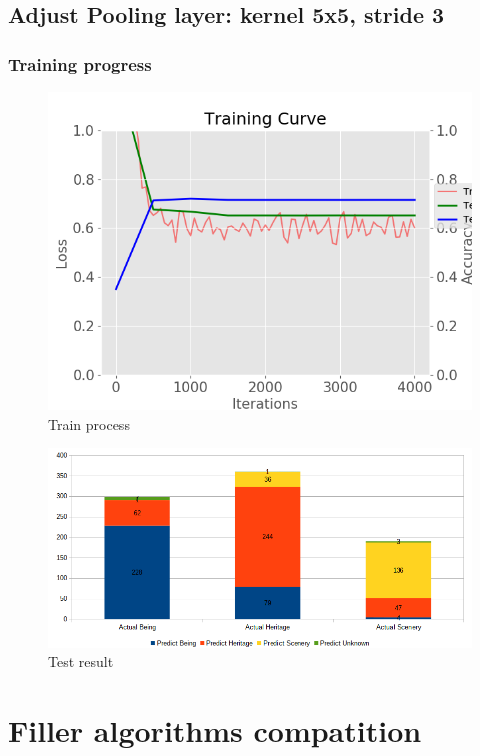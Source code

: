 \documentclass[11pt]{article}
\begin{document}
\subsection{Adjust Pooling layer: kernel 5x5, stride 3}

\subsubsection{Training progress}

\begin{figure}[H]
\centering
\includegraphics[width=1\textwidth]{images/train_large_dataset_pooling_5x5_stride_3}
\caption{Train process}
\end{figure}

\begin{figure}[H]
\centering
\includegraphics[width=1\textwidth]{images/result_large_dataset_pooling_5x5_stride_3}
\caption{Test result}
\end{figure}

\section{Filler algorithms compatition}
\end{document}
